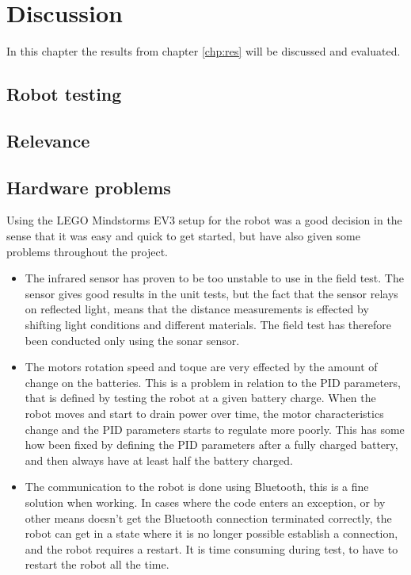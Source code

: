 \chapter{Discussion}
\label{chp:disc}
In this chapter the results from chapter \ref{chp:res} will be discussed and evaluated.

\section{Robot testing}

\section{Relevance}



\section{Hardware problems}
Using the LEGO Mindstorms EV3 setup for the robot was a good decision in the sense that it was easy and quick to get started, but have also given some problems throughout the project.

\begin{itemize}
	\item The infrared sensor has proven to be too unstable to use in the field test.
	The sensor gives good results in the unit tests, but the fact that the sensor relays on reflected light, means that the distance measurements is effected by shifting light conditions and different materials.
	The field test has therefore been conducted only using the sonar sensor.
	\item The motors rotation speed and toque are very effected by the amount of change on the batteries.
	This is a problem in relation to the PID parameters, that is defined by testing the robot at a given battery charge.
	When the robot moves and start to drain power over time, the motor characteristics change and the PID parameters starts to regulate more poorly.
	This has some how been fixed by defining the PID parameters after a fully charged battery, and then always have at least half the battery charged.
	\item The communication to the robot is done using Bluetooth, this is a fine solution when working.
	In cases where the code enters an exception, or by other means doesn't get the Bluetooth connection terminated correctly, the robot can get in a state where it is no longer possible establish a connection, and the robot requires a restart.
	It is time consuming during test, to have to restart the robot all the time.
\end{itemize}

